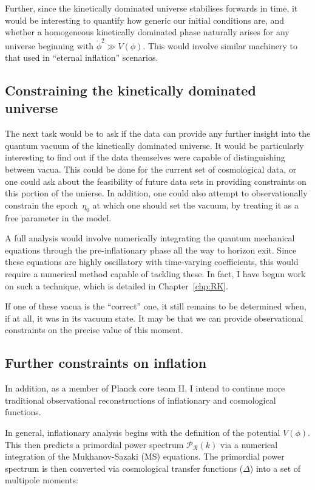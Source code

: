 Further, since the kinetically dominated universe stabilises forwards in time, it would be interesting to quantify how generic our initial conditions are, and whether a homogeneous kinetically dominated phase naturally arises for any universe beginning with \(\dot{\phi}^2\gg V(\phi)\). This would involve similar machinery to that used in ``eternal inflation'' scenarios.


\subsection*{Constraining the kinetically dominated universe}

The next task would be to ask if the data can provide any further insight into the quantum vacuum of the kinetically dominated universe. It would be particularly interesting to find out if the data themselves were capable of distinguishing between vacua. This could be done for the current set of cosmological data, or one could ask about the feasibility of future data sets in providing constraints on this portion of the unierse. In addition, one could also attempt to observationally constrain the epoch~\(\eta_0\) at which one should set the vacuum, by treating it as a free parameter in the model.

A full analysis would involve numerically integrating the quantum mechanical equations through the pre-inflationary phase all the way to horizon exit. Since these equations are highly oscillatory with time-varying coefficients, this would require a numerical method capable of tackling these. In fact, I have begun work on such a technique, which is detailed in Chapter~\ref{chp:RK}.

If one of these vacua is the ``correct'' one, it still remains to be determined when, if at all, it was in its vacuum state. It may be that we can provide observational constraints on the precise value of this moment.

\subsection*{Further constraints on inflation}
In addition, as a member of Planck core team II, I intend to continue more traditional observational reconstructions of inflationary and cosmological functions.

In general, inflationary analysis begins with the definition of the potential \(V(\phi)\). This then predicts a primordial power spectrum \(\mathcal{P}_\mathcal{R}(k)\) via a numerical integration of the Mukhanov-Sazaki (MS) equations. The primordial power spectrum is then converted via cosmological transfer functions (\(\Delta\)) into a set of multipole moments:

